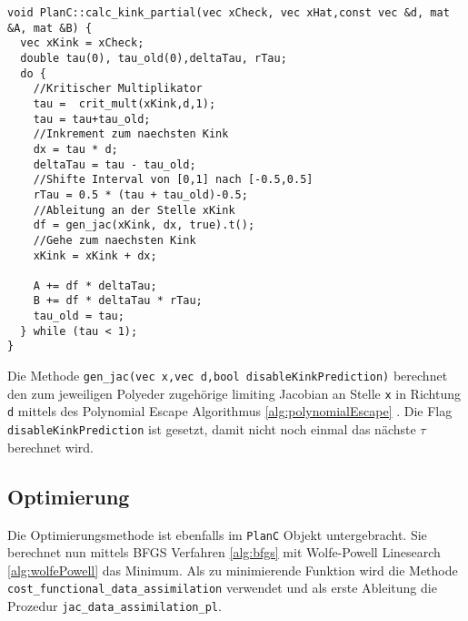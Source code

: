 \begin{lstlisting}[caption=Berechnung der gewichteten Ableitung, label=lst:kinkPartials]
void PlanC::calc_kink_partial(vec xCheck, vec xHat,const vec &d, mat &A, mat &B) {
  vec xKink = xCheck;
  double tau(0), tau_old(0),deltaTau, rTau;
  do {
    //Kritischer Multiplikator
    tau =  crit_mult(xKink,d,1);
    tau = tau+tau_old;
    //Inkrement zum naechsten Kink
    dx = tau * d;
    deltaTau = tau - tau_old;
    //Shifte Interval von [0,1] nach [-0.5,0.5]
    rTau = 0.5 * (tau + tau_old)-0.5;
    //Ableitung an der Stelle xKink
    df = gen_jac(xKink, dx, true).t();
    //Gehe zum naechsten Kink
    xKink = xKink + dx;

    A += df * deltaTau;
    B += df * deltaTau * rTau;
    tau_old = tau;
  } while (tau < 1);
}
\end{lstlisting}

Die Methode \texttt{gen\_jac(vec x,vec d,bool disableKinkPrediction)} berechnet den zum jeweiligen Polyeder zugehörige limiting Jacobian an Stelle \texttt{x} in Richtung \texttt{d} mittels des Polynomial Escape Algorithmus 
\ref{alg:polynomialEscape}
. Die Flag \texttt{disableKinkPrediction} ist gesetzt, damit nicht noch einmal das nächste $\tau$ berechnet wird.


\subsection{Optimierung}
Die Optimierungsmethode ist ebenfalls im \texttt{PlanC} Objekt untergebracht. Sie berechnet nun mittels BFGS Verfahren \ref{alg:bfgs} mit Wolfe-Powell Linesearch \ref{alg:wolfePowell} das Minimum. 
Als zu minimierende Funktion wird die Methode \texttt{cost\_functional\_data\_assimilation} verwendet und als erste Ableitung die Prozedur \texttt{jac\_data\_assimilation\_pl}.

% 
